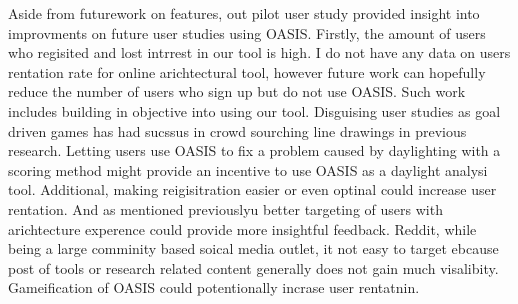 Aside from futurework on features, out pilot user study provided insight into improvments on future user studies using OASIS.
Firstly, the amount of users who regisited and lost intrrest in our tool is high.
I do not have any data on users rentation rate for online arichtectural tool, however future work can hopefully reduce the number of users who sign up but do not use OASIS.
Such work includes building in objective into using our tool.
Disguising user studies as goal driven games has had sucssus in crowd sourching line drawings in previous research\cite{}.
Letting users use OASIS to fix a problem caused by daylighting with a scoring method might provide an incentive to use OASIS as a daylight analysi tool.
Additional, making reigisitration easier or even optinal could increase user rentation.
And as mentioned previouslyu better targeting of users with arichtecture experence could provide more insightful feedback.
Reddit, while being a large comminity based soical media outlet, it not easy to target ebcause post of tools or research related content generally does not gain much visalibity.
Gameification of OASIS could potentionally incrase user rentatnin.
